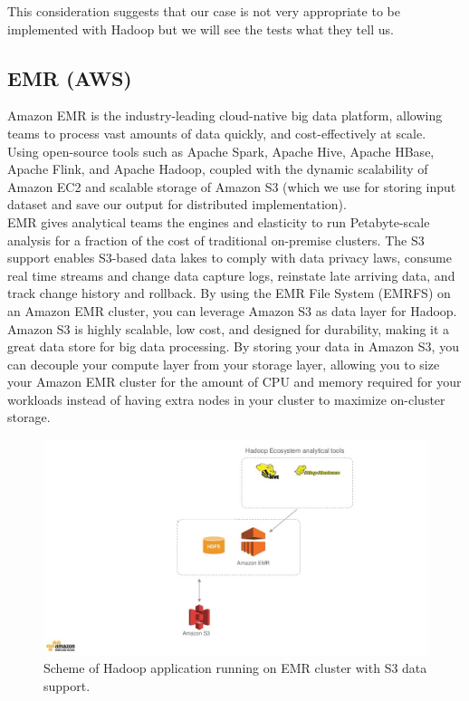 \documentclass[10pt,twocolumn,letterpaper]{article}
\begin{document}
This consideration suggests that our case is not very appropriate to be implemented with Hadoop but we will see the tests what they tell us.


\subsection{EMR (AWS)}

Amazon EMR is the industry-leading cloud-native big data platform, allowing teams to process vast amounts of data quickly, and cost-effectively at scale.\\
Using open-source tools such as Apache Spark, Apache Hive, Apache HBase, Apache Flink, and Apache Hadoop, coupled with the dynamic scalability of Amazon EC2 and scalable storage of Amazon S3 (which we use for storing input dataset and save our output for distributed implementation).\\
EMR gives analytical teams the engines and elasticity to run Petabyte-scale analysis for a fraction of the cost of traditional on-premise clusters. The S3 support enables S3-based data lakes to comply with data privacy laws, consume real time streams and change data capture logs, reinstate late arriving data, and track change history and rollback. 
By using the EMR File System (EMRFS) on an Amazon EMR cluster, you can leverage Amazon S3 as data layer for Hadoop. Amazon S3 is highly scalable, low cost, and designed for durability, making it a great data store for big data processing. By storing your data in Amazon S3, you can decouple your compute layer from your storage layer, allowing you to size your Amazon EMR cluster for the amount of CPU and memory required for your workloads instead of having extra nodes in your cluster to maximize on-cluster storage.\\

\begin{figure}[H]
\begin{center}
\includegraphics[width=\columnwidth]{template/latex/bigData.jpg}
\caption{Scheme of Hadoop application running on EMR cluster with S3 data support.}
\label{fig:short}
\end{center}
\end{figure}
\end{document}
